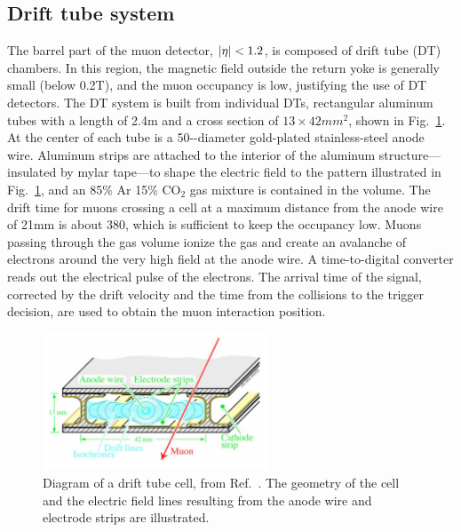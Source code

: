 \subsection{Drift tube system}

The barrel part of the muon detector, $\lvert \eta \rvert < 1.2$,
is composed of drift tube (DT) chambers. In this region, the magnetic field
outside the return yoke is generally small (below 0.2\unit{T}), and the muon occupancy is low, justifying
the use of DT detectors. The DT system is built from individual DTs, 
rectangular aluminum tubes with a length of 2.4\unit{m} and a cross section
of $13\times42\unit{mm}^2$, shown in Fig.~\ref{fig:DTs}. At the center of each
tube is a 50-\micron-diameter gold-plated stainless-steel anode wire.
Aluminum strips are attached to the interior of the aluminum 
structure---insulated by mylar tape---to
shape the electric field to the pattern illustrated in Fig.~\ref{fig:DTs},
and an 85\% Ar 15\% CO$_2$ gas mixture is contained in the volume. 
The drift time for muons crossing a
cell at a maximum distance from the anode wire of 21\unit{mm}
is about 380\micron, which is sufficient to keep the occupancy low.
Muons passing through the gas volume ionize the gas and create an avalanche of
electrons around the very high field at the anode wire.
A time-to-digital converter reads out the electrical pulse of the electrons.
The arrival time of the signal, corrected by the drift velocity and the time
from the collisions to the trigger decision, are used to obtain the muon interaction
position. 

\begin{figure}[htbp]
  \centering
   \includegraphics[width=0.6\textwidth]{figures/LHCandCMS/DriftTubeCutaway.png}
  \caption{
    Diagram of a drift tube cell, from Ref.~\cite{Chatrchyan:2008aa}. The 
    geometry of the cell and the electric field lines resulting from the 
    anode wire and electrode strips are illustrated.
        }
 \label{fig:DTs}
\end{figure}


